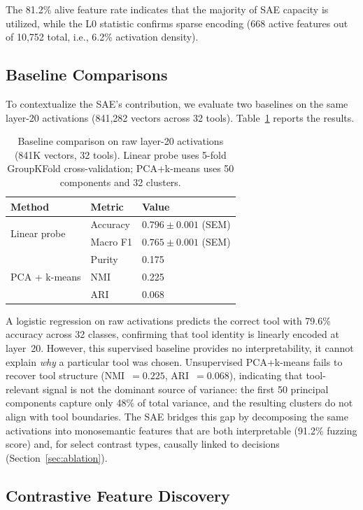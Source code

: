 \documentclass[runningheads]{llncs}
\begin{document}
The 81.2\% alive feature rate indicates that the majority of SAE capacity is utilized, while the L0 statistic confirms sparse encoding (668 active features out of 10,752 total, i.e., 6.2\% activation density).

\subsection{Baseline Comparisons}

To contextualize the SAE's contribution, we evaluate two baselines on the same layer-20 activations (841,282 vectors across 32 tools). Table~\ref{tab:baselines} reports the results.

\begin{table}[t]
\caption{Baseline comparison on raw layer-20 activations (841K vectors, 32 tools). Linear probe uses 5-fold GroupKFold cross-validation; PCA+k-means uses 50 components and 32 clusters.}
\label{tab:baselines}
\centering
\begin{tabular}{lll}
\toprule
Method & Metric & Value \\
\midrule
\multirow{2}{*}{Linear probe} & Accuracy & $0.796 \pm 0.001$ (SEM) \\
 & Macro F1 & $0.765 \pm 0.001$ (SEM) \\
\midrule
\multirow{3}{*}{PCA + k-means} & Purity & 0.175 \\
 & NMI & 0.225 \\
 & ARI & 0.068 \\
\bottomrule
\end{tabular}
\end{table}

A logistic regression on raw activations predicts the correct tool with 79.6\% accuracy across 32 classes, confirming that tool identity is linearly encoded at layer~20. However, this supervised baseline provides no interpretability, it cannot explain \emph{why} a particular tool was chosen. Unsupervised PCA+k-means fails to recover tool structure (NMI~$= 0.225$, ARI~$= 0.068$), indicating that tool-relevant signal is not the dominant source of variance: the first 50 principal components capture only 48\% of total variance, and the resulting clusters do not align with tool boundaries. The SAE bridges this gap by decomposing the same activations into monosemantic features that are both interpretable (91.2\% fuzzing score) and, for select contrast types, causally linked to decisions (Section~\ref{sec:ablation}).

\subsection{Contrastive Feature Discovery}
\end{document}
